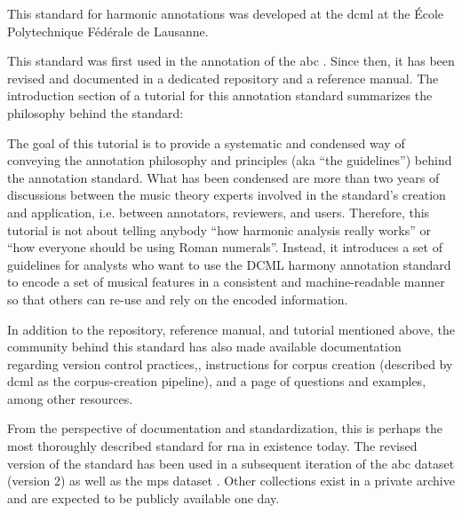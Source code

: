 

This standard for harmonic annotations was developed at the
\gls{dcml} at the \'Ecole Polytechnique F\'ed\'erale de
Lausanne.

This standard was first used in the annotation of the
\gls{abc}
\parencite{neuwirth2018annotated}. Since then, it has been
revised and documented in a dedicated
repository
and a reference
manual.
The introduction section of a tutorial for this annotation
standard summarizes the philosophy behind the
standard:

\begin{italicsquote}
    The goal of this tutorial is to provide a systematic and
    condensed way of conveying the annotation philosophy and
    principles (aka ``the guidelines'') behind the
    annotation standard. What has been condensed are more
    than two years of discussions between the music theory
    experts involved in the standard's creation and
    application, i.e. between annotators, reviewers, and
    users. Therefore, this tutorial is not about telling
    anybody ``how harmonic analysis really works'' or ``how
    everyone should be using Roman numerals''. Instead, it
    introduces a set of guidelines for analysts who want to
    use the DCML harmony annotation standard to encode a set
    of musical features in a consistent and machine-readable
    manner so that others can re-use and rely on the encoded
    information.
\end{italicsquote}

In addition to the repository, reference manual, and
tutorial mentioned above, the community behind this standard
has also made available documentation regarding version
control
practices,,
instructions for corpus creation (described by \gls{dcml} as
the corpus-creation
pipeline),
and a page of questions and
examples,
among other resources.

From the perspective of documentation and standardization,
this is perhaps the most thoroughly described standard for
\gls{rna} in existence today. The revised version of the
standard has been used in a subsequent iteration of the
\gls{abc} dataset (version 2) as well as the \gls{mps}
dataset \parencite{hentschel2021annotated}. Other
collections exist in a private archive and are expected to
be publicly available one day.
